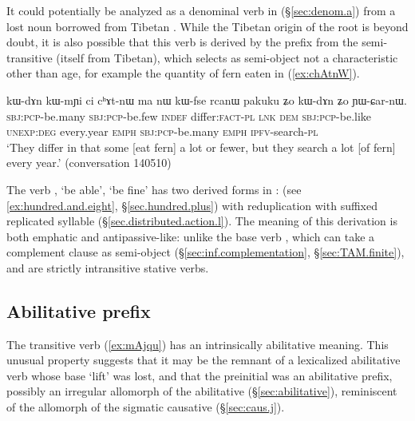 It could potentially be analyzed as a denominal verb in  (§\ref{sec:denom.a}) from a lost noun  borrowed from Tibetan . While the Tibetan origin of the root is beyond doubt, it is also possible that this verb is derived by the  prefix from the semi-transitive  (itself from Tibetan), which selects as semi-object not a characteristic other than age, for example the quantity of fern eaten in (\ref{ex:chAtnW}).
\largerpage
\begin{exe}
\ex \label{ex:chAtnW} 
\gll kɯ-dɤn kɯ-mɲi ci cʰɤt-nɯ ma nɯ kɯ-fse rcanɯ pakuku ʑo kɯ-dɤn ʑo ɲɯ-ɕar-nɯ.  \\
\textsc{sbj}:\textsc{pcp}-be.many \textsc{sbj}:\textsc{pcp}-be.few \textsc{indef} differ:\textsc{fact}-\textsc{pl} \textsc{lnk} \textsc{dem} \textsc{sbj}:\textsc{pcp}-be.like \textsc{unexp}:\textsc{deg} every.year \textsc{emph} \textsc{sbj}:\textsc{pcp}-be.many \textsc{emph} \textsc{ipfv}-search-\textsc{pl} \\
\glt `They differ in that some [eat fern] a lot or fewer, but they search a lot [of fern] every year.' (conversation 140510)
\end{exe}

The verb , `be able', `be fine' has two derived forms in :  (see \ref{ex:hundred.and.eight}, §\ref{sec.hundred.plus}) with reduplication  with suffixed  replicated syllable (§\ref{sec.distributed.action.l}). The meaning of this derivation is both emphatic and antipassive-like: unlike the base verb , which can take a complement clause as semi-object (§\ref{sec:inf.complementation}, §\ref{sec:TAM.finite}),  and  are strictly intransitive stative verbs.

\subsection{Abilitative  prefix  } \label{sec:j.abilitative}
The transitive verb  (\ref{ex:mAjqu}) has an intrinsically abilitative meaning. This unusual property suggests that it may be the remnant of a lexicalized abilitative verb whose base  `lift' was lost, and that the  preinitial was an abilitative prefix, possibly an irregular allomorph of the  abilitative (§\ref{sec:abilitative}), reminiscent of the  allomorph of the sigmatic causative (§\ref{sec:caus.j}).

